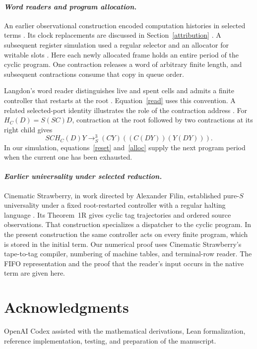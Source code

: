 \documentclass[11pt,letterpaper,oneside,reqno]{amsart}
\begin{document}
\paragraph{\textit{Word readers and program allocation.}}
An earlier observational construction encoded computation histories in selected terms \cite{observed}. Its clock replacements are discussed in Section~\ref{attribution} \cite{replacement}. A subsequent register simulation used a regular selector and an allocator for writable slots \cite{five}. Here each newly allocated frame holds an entire period of the cyclic program. One contraction releases a word of arbitrary finite length, and subsequent contractions consume that copy in queue order.

Langdon's word reader distinguishes live and spent cells and admits a finite controller that restarts at the root \cite{langdonword}. Equation~\eqref{read} uses this convention. A related selected-port identity illustrates the role of the contraction address \cite{langdonport}. For \(H_C(D)=S(SC)D\), contraction at the root followed by two contractions at its right child gives
\[
 S C H_C(D)Y \longrightarrow_S^3 (CY)((C(DY))(Y(DY))).
\]
In our simulation, equations~\eqref{reset} and~\eqref{alloc} supply the next program period when the current one has been exhausted.

\paragraph{\textit{Earlier universality under selected reduction.}}
Cinematic Strawberry, in work directed by Alexander Filin, established pure-\(S\) universality under a fixed root-restarted controller with a regular halting language \cite{filin}. Its Theorem~1R gives cyclic tag trajectories and ordered source observations. That construction specializes a dispatcher to the cyclic program. In the present construction the same controller acts on every finite program, which is stored in the initial term. Our numerical proof uses Cinematic Strawberry's tape-to-tag compiler, numbering of machine tables, and terminal-row reader. The FIFO representation and the proof that the reader's input occurs in the native term are given here.



\section*{Acknowledgments}
OpenAI Codex assisted with the mathematical derivations, Lean formalization, reference implementation, testing, and preparation of the manuscript.
\end{document}
